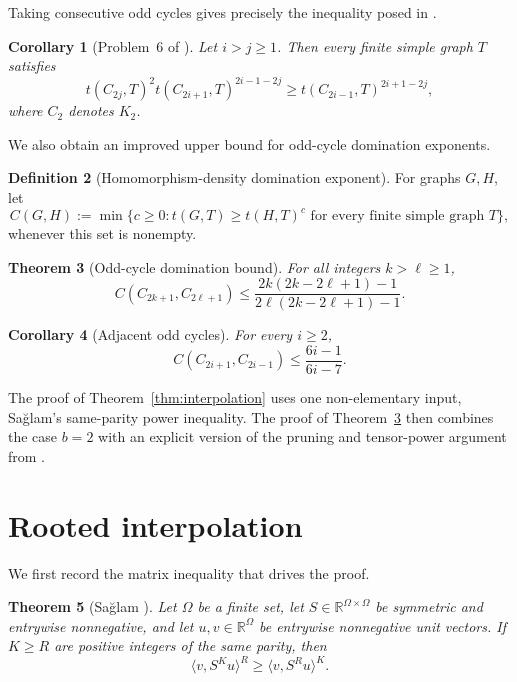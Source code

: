 \documentclass[11pt]{article}
\newtheorem{theorem}{Theorem}[section]
\newtheorem{corollary}[theorem]{Corollary}
\theoremstyle{definition}
\newtheorem{definition}[theorem]{Definition}
\theoremstyle{remark}
\newcommand{\R}{\mathbb{R}}
\begin{document}
Taking consecutive odd cycles gives precisely the inequality posed in
\cite[Problem~6]{BRRW2025}.

\begin{corollary}[Problem~6 of \cite{BRRW2025}]
  \label{cor:problem6}
  Let $i>j\ge1$.  Then every finite simple graph $T$ satisfies
  \begin{equation}
    t(C_{2j},T)^2
    t(C_{2i+1},T)^{2i-1-2j}
    \ge
    t(C_{2i-1},T)^{2i+1-2j},
    \label{eq:problem6}
  \end{equation}
  where $C_2$ denotes $K_2$.
\end{corollary}

We also obtain an improved upper bound for odd-cycle domination
exponents.

\begin{definition}[Homomorphism-density domination exponent]
  For graphs $G,H$, let
  \[
    C(G,H)
    :=
    \min\bigl\{c\ge0:
    t(G,T)\ge t(H,T)^c
    \text{ for every finite simple graph }T\bigr\},
  \]
  whenever this set is nonempty.
\end{definition}

\begin{theorem}[Odd-cycle domination bound]
  \label{thm:domination}
  For all integers $k>\ell\ge1$,
  \begin{equation}
    C(C_{2k+1},C_{2\ell+1})
    \le
    \frac{2k(2k-2\ell+1)-1}
         {2\ell(2k-2\ell+1)-1}.
    \label{eq:domination}
  \end{equation}
\end{theorem}

\begin{corollary}[Adjacent odd cycles]
  \label{cor:adjacent}
  For every $i\ge2$,
  \[
    C(C_{2i+1},C_{2i-1})
    \le \frac{6i-1}{6i-7}.
  \]
\end{corollary}

The proof of Theorem~\ref{thm:interpolation} uses one non-elementary
input, Sa\u{g}lam's same-parity power inequality.  The proof of
Theorem~\ref{thm:domination} then combines the case $b=2$ with an
explicit version of the pruning and tensor-power argument from
\cite{BRRW2025}.

\section{Rooted interpolation}

We first record the matrix inequality that drives the proof.

\begin{theorem}[Sa\u{g}lam \cite{Saglam2018}]
  \label{thm:saglam}
  Let $\Omega$ be a finite set, let
  $S\in\R^{\Omega\times\Omega}$ be symmetric and entrywise
  nonnegative, and let $u,v\in\R^\Omega$ be entrywise nonnegative unit
  vectors.  If $K\ge R$ are positive integers of the same parity, then
  \begin{equation}
    \langle v,S^K u\rangle^R
    \ge
    \langle v,S^R u\rangle^K.
    \label{eq:saglam}
  \end{equation}
\end{theorem}
\end{document}
